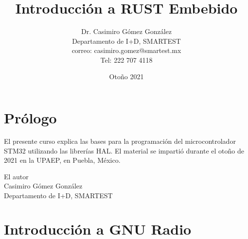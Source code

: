 \documentclass[12pt]{book}
\title{Introducción a RUST Embebido}
\author{Dr. Casimiro Gómez González\\
	Departamento de I+D, SMARTEST\\
               correo: casimiro.gomez@smartest.mx\\
               Tel: 222 707 4118}
\date{Otoño 2021}
\theoremstyle{definition}
\theoremstyle{remark}
\theoremstyle{plain}
\begin{document}
\frontmatter
\maketitle


\chapter{Prólogo}

El presente curso explica las bases para la programación del microcontrolador STM32 utilizando las librerías HAL. El material se impartió durante el otoño de 2021 en la UPAEP, en Puebla, México.

\begin{flushright}

El autor\\
Casimiro Gómez González\\
Departamento de I+D, SMARTEST
\end{flushright}

\tableofcontents

\mainmatter


\chapter{Introducción a GNU Radio}


\backmatter
\end{document}
